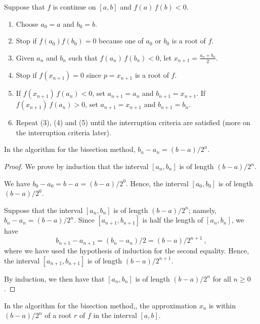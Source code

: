 \begin{algo}[Bisection]
Suppose that $f$ is continue on $[a,b]$ and $f(a)\,f(b)<0$.
\begin{enumerate}
\item Choose $a_0=a$ and $b_0=b$.
\item Stop if $f(a_0)f(b_0) = 0$ because one of $a_0$ or $b_0$ is a
root of $f$. \label{BisectAlgo2}
\item Given $a_n$ and $b_n$ such that $f(a_n)\,f(b_n)<0$,
let $\displaystyle x_{n+1}=\frac{a_n+b_n}{2}$.
\item Stop if $f(x_{n+1})=0$ since $p=x_{n+1}$ is a root of $f$.
\label{BisectAlgo4}
\item If $f(x_{n+1})\,f(a_n) < 0$, set $a_{n+1}=a_n$ and
$b_{n+1}=x_{n+1}$.  If $f(x_{n+1})\,f(a_n) > 0$, set $a_{n+1}=x_{n+1}$
and $b_{n+1}=b_n$.
\item Repeat (3), (4) and (5) until the interruption criteria are satisfied
(more on the interruption criteria later).
\end{enumerate}
\label{BisectAlgo}
\end{algo}

\begin{prop}
In the algorithm for the bisection method, $b_n - a_n = (b-a)/2^n$.
\label{bisecProp1}
\end{prop}

\begin{proof}
We prove by induction that the interval $[a_n,b_n]$ is of length
$(b-a)/2^n$.

We have $b_0 - a_0 = b - a = (b-a)/2^0$.  Hence, the interval
$[a_0,b_0]$ is of length $(b-a)/2^0$.

Suppose that the interval $[a_n,b_n]$ is of length $(b-a)/2^n$;
namely, $b_n-a_n = (b-a)/2^n$.  Since $[a_{n+1},b_{n+1}]$ is
half the length of $[a_n,b_n]$, we have
\[
b_{n+1} - a_{n+1} = (b_n-a_n)/2 = (b-a)/2^{n+1} \ ,
\]
where we have used the hypothesis of induction for the second
equality.  Hence, the interval $[a_{n+1},b_{n+1}]$ is of length
$(b-a)/2^{n+1}$.

By induction, we then have that $[a_n,b_n]$ is of length $(b-a)/2^n$
for all $n\geq 0$.
\end{proof}

\begin{cor}
In the algorithm for the bisection method,, the approximation $x_{n}$
is within $(b-a)/2^n$ of a root $r$ of $f$ in the interval $[a,b]$.
\label{bisectCor}
\end{cor}

